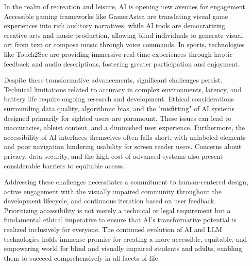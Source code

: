 In the realm of recreation and leisure, AI is opening new avenues for engagement. Accessible gaming frameworks like GamerAstra are translating visual game experiences into rich auditory narratives, while AI tools are democratizing creative arts and music production, allowing blind individuals to generate visual art from text or compose music through voice commands. In sports, technologies like Touch2See are providing immersive real-time experiences through haptic feedback and audio descriptions, fostering greater participation and enjoyment.

Despite these transformative advancements, significant challenges persist. Technical limitations related to accuracy in complex environments, latency, and battery life require ongoing research and development. Ethical considerations surrounding data quality, algorithmic bias, and the "misfitting" of AI systems designed primarily for sighted users are paramount. These issues can lead to inaccuracies, ableist content, and a diminished user experience. Furthermore, the accessibility of AI interfaces themselves often falls short, with unlabeled elements and poor navigation hindering usability for screen reader users. Concerns about privacy, data security, and the high cost of advanced systems also present considerable barriers to equitable access.

Addressing these challenges necessitates a commitment to human-centered design, active engagement with the visually impaired community throughout the development lifecycle, and continuous iteration based on user feedback. Prioritizing accessibility is not merely a technical or legal requirement but a fundamental ethical imperative to ensure that AI's transformative potential is realized inclusively for everyone. The continued evolution of AI and LLM technologies holds immense promise for creating a more accessible, equitable, and empowering world for blind and visually impaired students and adults, enabling them to succeed comprehensively in all facets of life.


